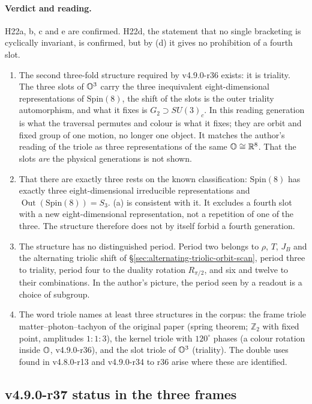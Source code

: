 \paragraph{Verdict and reading.}
H22a, b, c and e are confirmed.  H22d, the statement that no single bracketing is cyclically invariant, is confirmed, but by (d)
it gives no prohibition of a fourth slot.
\begin{enumerate}[leftmargin=2em]
\item The second three-fold structure required by v4.9.0-r36 exists: it is triality.  The three slots of \(\mathbb{O}^3\) carry the three
inequivalent eight-dimensional representations of \(\mathrm{Spin}(8)\), the shift of the slots is the outer triality automorphism,
and what it fixes is \(G_2\supset SU(3)_c\).  In this reading generation is what the traversal permutes and colour is what it
fixes; they are orbit and fixed group of one motion, no longer one object.  It matches the author's reading of the triole as
three representations of the same \(\mathbb{O}\cong\mathbb R^8\).  That the slots \emph{are} the physical generations is not shown.
\item That there are exactly three rests on the known classification: \(\mathrm{Spin}(8)\) has exactly three eight-dimensional
irreducible representations and \(\operatorname{Out}(\mathrm{Spin}(8))=S_3\).  (a) is consistent with it.  It excludes a fourth slot
with a new eight-dimensional representation, not a repetition of one of the three.  The structure therefore does not by itself
forbid a fourth generation.
\item The structure has no distinguished period.  Period two belongs to \(\rho\), \(T\), \(J_B\) and the alternating triolic shift of
\S\ref{sec:alternating-triolic-orbit-scan}, period three to triality, period four to the duality rotation \(R_{\pi/2}\), and six and
twelve to their combinations.  In the author's picture, the period seen by a readout is a choice of subgroup.
\item The word triole names at least three structures in the corpus: the frame triole matter--photon--tachyon of the original
paper (spring theorem; \(\mathbb Z_2\) with fixed point, amplitudes \(1:1:3\)), the kernel triole with \(120^\circ\) phases (a colour
rotation inside \(\mathbb{O}\), v4.9.0-r36), and the slot triole of \(\mathbb{O}^3\) (triality).  The double uses found in v4.8.0-r13 and
v4.9.0-r34 to r36 arise where these are identified.
\end{enumerate}

\subsection*{v4.9.0-r37 status in the three frames}
\label{subsec:v490-r37-frames}

